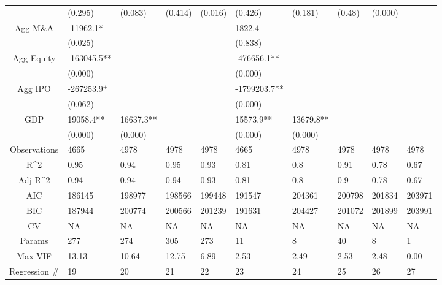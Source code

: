 \documentclass{article}
\begin{document}
\begin{table}[H]
\begin{tabular}{|clllllllll|}
   & (0.295) & (0.083) & (0.414) & (0.016) & (0.426) & (0.181) & (0.48) & (0.000) &  \\ 
  Agg M\&A & -11962.1* &  &  &  & 1822.4 &  &  &  &  \\ 
   & (0.025) &  &  &  & (0.838) &  &  &  &  \\ 
  Agg Equity & -163045.5** &  &  &  & -476656.1** &  &  &  &  \\ 
   & (0.000) &  &  &  & (0.000) &  &  &  &  \\ 
  Agg IPO & -267253.9$^{+}$ &  &  &  & -1799203.7** &  &  &  &  \\ 
   & (0.062) &  &  &  & (0.000) &  &  &  &  \\ 
  GDP & 19058.4** & 16637.3** &  &  & 15573.9** & 13679.8** &  &  &  \\ 
   & (0.000) & (0.000) &  &  & (0.000) & (0.000) &  &  &  \\ 
  \hline 
 Observations & 4665 & 4978 & 4978 & 4978 & 4665 & 4978 & 4978 & 4978 & 4978 \\ 
  R^2 & 0.95 & 0.94 & 0.95 & 0.93 & 0.81 & 0.8 & 0.91 & 0.78 & 0.67 \\ 
  Adj R^2 & 0.94 & 0.94 & 0.94 & 0.93 & 0.81 & 0.8 & 0.9 & 0.78 & 0.67 \\ 
  AIC & 186145 & 198977 & 198566 & 199448 & 191547 & 204361 & 200798 & 201834 & 203971 \\ 
  BIC & 187944 & 200774 & 200566 & 201239 & 191631 & 204427 & 201072 & 201899 & 203991 \\ 
  CV & NA & NA & NA & NA & NA & NA & NA & NA & NA \\ 
  Params & 277 & 274 & 305 & 273 & 11 & 8 & 40 & 8 & 1 \\ 
  Max VIF & 13.13 & 10.64 & 12.75 & 6.89 & 2.53 & 2.49 & 2.53 & 2.48 & 0.00 \\ 
  Regression \# & 19 & 20 & 21 & 22 & 23 & 24 & 25 & 26 & 27 \\ 
   \hline
\end{tabular}
 
\end{table}
\end{document}
